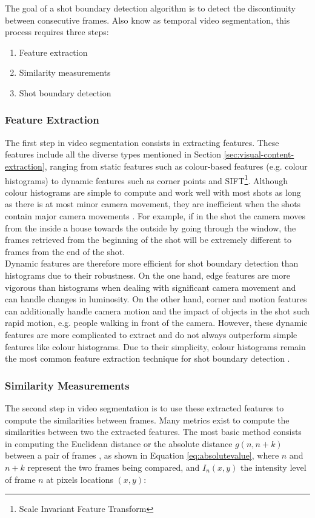 The goal of a shot boundary detection algorithm is to detect the discontinuity between consecutive frames. Also know as temporal video segmentation, this process requires three steps:
\begin{enumerate}
    \item Feature extraction
    \item Similarity measurements
    \item Shot boundary detection
\end{enumerate}

\subsubsection{Feature Extraction}
\label{sec:feature-extraction-sbd}
The first step in video segmentation consists in extracting features. These features include all the diverse types mentioned in Section \ref{sec:visual-content-extraction}, ranging from static features such as colour-based features (e.g. colour histograms) \cite{hoi2006trecvid06} to dynamic features such as corner points and SIFT\footnote{Scale Invariant Feature Transform}. Although colour histograms are simple to compute and work well with most shots as long as there is at most minor camera movement, they are inefficient when the shots contain major camera movements \cite{hu2011survey}. For example, if in the shot the camera moves from the inside a house towards the outside by going through the window, the frames retrieved from the beginning of the shot will be extremely different to frames from the end of the shot.\\

Dynamic features are therefore more efficient for shot boundary detection than histograms due to their robustness. On the one hand, edge features are more vigorous than histograms when dealing with significant camera movement and can handle changes in luminosity. On the other hand, corner and motion features can additionally handle camera motion and the impact of objects in the shot such rapid motion, e.g. people walking in front of the camera. However, these dynamic features are more complicated to extract and do not always outperform simple features like colour histograms. Due to their simplicity, colour histograms remain the most common feature extraction technique for shot boundary detection \cite{yuan2007shotboundary}.\\

\subsubsection{Similarity Measurements}
\label{sec:similarity-measurements-sbd}
The second step in video segmentation is to use these extracted features to compute the similarities between frames. Many metrics exist to compute the similarities between two the extracted features. The most basic method consists in computing the Euclidean distance or the absolute distance $g(n,n+k)$ between a pair of frames \cite[p.476]{janwe2013video}, as shown in Equation \ref{eq:absolutevalue}, where $n$ and $n+k$ represent the two frames being compared, and $I_n(x,y)$ the intensity level of frame $n$ at pixels locations $(x,y)$:

